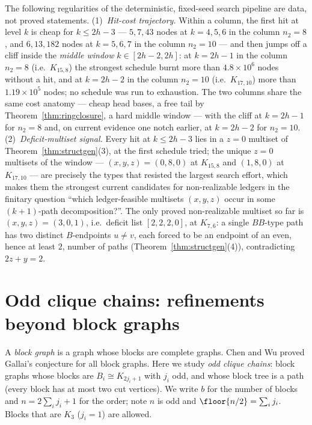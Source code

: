 \begin{observation}\label{obs:costwall}
The following regularities of the deterministic, fixed-seed search pipeline are data, not
proved statements.
(1)~\emph{Hit-cost trajectory.} Within a column, the first hit at level $k$ is cheap for
$k\le 2h-3$ --- $5,7,43$ nodes at $k=4,5,6$ in the column $n_2=8$, and $6,13,182$ nodes at
$k=5,6,7$ in the column $n_2=10$ --- and then jumps off a cliff inside the \emph{middle
window} $k\in[2h-2,2h]$: at $k=2h-1$ in the column $n_2=8$ (i.e.\ $K_{15,8}$) the strongest
schedule burnt more than $4.8\times10^6$ nodes without a hit, and at $k=2h-2$ in the column
$n_2=10$ (i.e.\ $K_{17,10}$) more than $1.19\times10^5$ nodes; no schedule was run to
exhaustion. The two columns share the same cost anatomy --- cheap head bases, a free tail by
Theorem~\ref{thm:ringclosure}, a hard middle window --- with the cliff at $k=2h-1$ for
$n_2=8$ and, on current evidence one notch earlier, at $k=2h-2$ for $n_2=10$.
(2)~\emph{Deficit-multiset signal.} Every hit at $k\le 2h-3$ lies in a $z=0$ multiset of
Theorem~\ref{thm:structgen}(3), at the first schedule tried; the unique $z=0$ multisets of the
window --- $(x,y,z)=(0,8,0)$ at $K_{15,8}$ and $(1,8,0)$ at $K_{17,10}$ --- are precisely the
types that resisted the largest search effort, which makes them the strongest current
candidates for non-realizable ledgers in the finitary question ``which ledger-feasible
multisets $(x,y,z)$ occur in some $(k+1)$-path decomposition?''. The only proved
non-realizable multiset so far is $(x,y,z)=(3,0,1)$, i.e.\ deficit list $[2,2,2,0]$, at
$K_{7,6}$: a single $BB$-type path has two distinct $B$-endpoints $u\ne v$, each forced to be
an endpoint of an even, hence at least $2$, number of paths
(Theorem~\ref{thm:structgen}(4)), contradicting $2z+y=2$.
\end{observation}

\section{Odd clique chains: refinements beyond block graphs}\label{sec:chains}

A \emph{block graph} is a graph whose blocks are complete graphs. Chen and Wu \cite{CW25} proved
Gallai's conjecture for all block graphs. Here we study \emph{odd clique chains}: block graphs
whose blocks are $B_i\cong K_{2j_i+1}$ with $j_i$ odd, and whose block tree is a path (every
block has at most two cut vertices). We write $b$ for the number of blocks and
$n=2\sum_ij_i+1$ for the order; note $n$ is odd and $\floor{n/2}=\sum_ij_i$. Blocks that are
$K_3$ ($j_i=1$) are allowed.

